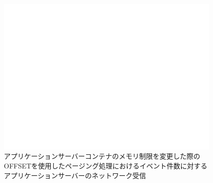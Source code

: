 \documentclass[../../../../../main]{subfiles}
\begin{document}
    \begin{figure}[H]
        \centering
        \includegraphics[width=12cm]{graph}
        \caption{アプリケーションサーバーコンテナのメモリ制限を変更した際のOFFSETを使用したページング処理におけるイベント件数に対するアプリケーションサーバーのネットワーク受信}
        \label{fig:paging-offset-change-app-memory-limit-app-net-in-app_4_db_1_1024}
    \end{figure}
\end{document}
